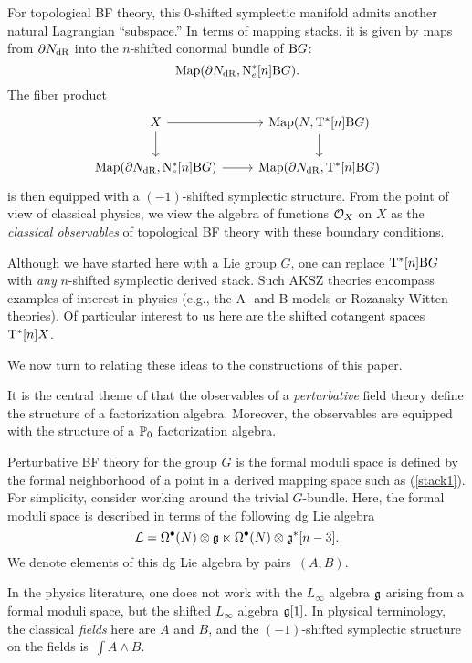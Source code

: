 \documentclass[11pt]{amsart}
\numberwithin{equation}{section}
\begin{document}
For topological BF theory, this $0$-shifted symplectic manifold admits another natural Lagrangian ``subspace.'' 
In terms of mapping stacks, it is given by maps from $\partial N_{\rm dR}$ into the $n$-shifted conormal bundle of ${\rm B} G$:
\[
{\rm Map}(\partial N_{\rm dR} , {\rm N}^*_e [n] {\rm B}G) .
\]
The fiber product
\[
\begin{tikzcd}
X \ar[r] \ar[d] & {\rm Map} (N , {\rm T}^* [n] {\rm B} G) \ar[d] \\
{\rm Map}(\partial N_{\rm dR} , {\rm N}^*_e  [n] {\rm B}G) \ar[r] & {\rm Map}(\partial N_{\rm dR} , {\rm T}^*[n]  {\rm B}G)
\end{tikzcd}
\]
is then equipped with a $(-1)$-shifted symplectic structure. 
From the point of view of classical physics, 
we view the algebra of functions $\mathcal O_X$ on $X$ as the {\em classical observables} of topological BF theory with these boundary conditions.

Although we have started here with a Lie group $G$, 
one can replace ${\rm T}^*[n] {\rm B}G$ with {\em any} $n$-shifted symplectic derived stack.
Such AKSZ theories encompass examples of interest in physics (e.g., the A- and B-models or Rozansky-Witten theories).
Of particular interest to us here are the shifted cotangent spaces~${\rm T}^*[n] X$.

We now turn to relating these ideas to the constructions of this paper.

It is the central theme of \cite{CG1, CG2} that the observables of a {\em perturbative} field theory define the structure of a factorization algebra. 
Moreover, the observables are equipped with the structure of a $\mathbb P_0$ factorization algebra.

Perturbative BF theory for the group $G$ is the formal moduli space is defined by the formal neighborhood of a point in a derived mapping space such as (\ref{stack1}). 
For simplicity, consider working around the trivial $G$-bundle. 
Here, the formal moduli space is described in terms of the following dg Lie algebra 
\begin{equation}\label{eqn:fields}
\mathcal L = \Omega^{\bullet} (N) \otimes \mathfrak g \ltimes \Omega^{\bullet} (N) \otimes \mathfrak g^* [n-3] .
\end{equation}
We denote elements of this dg Lie algebra by pairs~$(A,B)$. 

\begin{rmk}
In the physics literature, one does not work with the $L_\infty$ algebra $\mathfrak g$ arising from a formal moduli space,
but the shifted $L_\infty$ algebra $\mathfrak g[1]$. 
In physical terminology, the classical {\em fields} here are $A$ and $B$, 
and the $(-1)$-shifted symplectic structure on the fields is~$\int A \wedge B$. 
\end{rmk}
\end{document}
